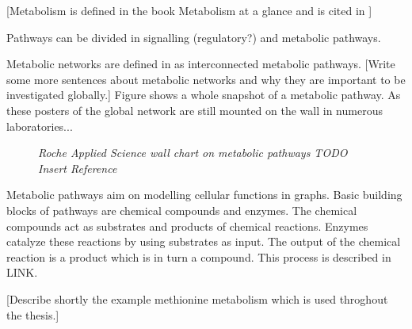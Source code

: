 [Metabolism is defined in the book Metabolism at a glance and is cited in \citep{Bourqui2006}]

Pathways can be divided in signalling (regulatory?) and metabolic pathways.

Metabolic networks are defined in \citep{Bourqui2006} as interconnected metabolic pathways.
[Write some more sentences about metabolic networks and why they are important to be investigated globally.]
Figure  shows a whole snapshot of a metabolic pathway. As these posters of the global network are still mounted on the wall in numerous laboratories... 

\begin{figure}[ht]
\centering
{} 
\caption[Roche Applied Science wall chart on metabolic pathways]{\textit{Roche Applied Science wall chart on metabolic pathways TODO Insert Reference}} 
\label{gfx:RocheAppliedScience_MetabolicPathways_WallChart}
\end{figure}

Metabolic pathways aim on modelling cellular functions in graphs. Basic building blocks of pathways are chemical compounds and enzymes. The chemical compounds act as substrates and products of chemical reactions. Enzymes catalyze these reactions by using substrates as input. The output of the chemical reaction is a product which is in turn a compound. This process is described in LINK. 

[Describe shortly the example methionine metabolism which is used throghout the thesis.]

